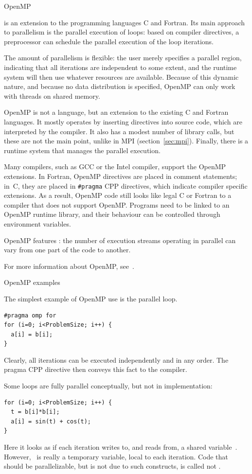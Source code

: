  {OpenMP}
\label{sec:openmp}

 is an extension to the programming languages
C and Fortran.
Its main approach to parallelism is the parallel execution of loops:
based on compiler directives, a preprocessor can schedule the parallel
execution of the loop iterations.

The amount of parallelism is flexible: the user merely specifies a
parallel region, indicating that all iterations are independent to
some extent, and the runtime system will then use whatever resources
are available. Because of this dynamic nature, and because no data
distribution is specified, OpenMP can only work with threads on shared
memory.

OpenMP is not a language, but an extension to the existing C and
Fortran languages. It mostly operates by inserting
directives into source code, which are interpreted by the
compiler. It also has a modest number of library calls, but these are
not the main point, unlike in MPI (section~\ref{sec:mpi}). Finally,
there is a runtime system that manages the parallel execution.

Many compilers, such as GCC or the Intel compiler, support
the OpenMP extensions. In Fortran, OpenMP directives are placed in
comment statements; in~C, they are placed in \verb+#pragma+ CPP
directives, which indicate compiler specific extensions. As a result,
OpenMP code still looks like legal C or Fortran to a compiler that
does not support OpenMP. Programs need to be linked to an OpenMP
runtime library, and their behaviour can be controlled through
environment variables.

OpenMP features : the number of
execution streams operating in parallel can vary from one part of the
code to another.

For more information about OpenMP, see~\cite{Chapman2008:OpenMPbook}.

 {OpenMP examples}

The simplest example of OpenMP use is the parallel loop. 
\begin{verbatim}
#pragma omp for
for (i=0; i<ProblemSize; i++) {
  a[i] = b[i];
}
\end{verbatim}
Clearly, all iterations can be executed independently and in any
order. The pragma CPP directive then conveys this fact to the
compiler.

Some loops are fully parallel conceptually, but not in implementation:
\begin{verbatim}
for (i=0; i<ProblemSize; i++) {
  t = b[i]*b[i];
  a[i] = sin(t) + cos(t);
}
\end{verbatim}
Here it looks as if each iteration writes to, and reads from, a shared
variable~. However, ~is really a temporary variable,
local to each iteration. Code that should be parallelizable, but is
not due to such constructs, is called not .

